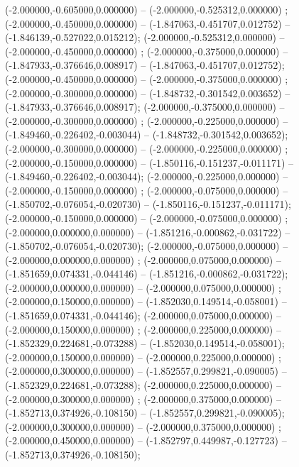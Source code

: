  (-2.000000,-0.605000,0.000000) -- (-2.000000,-0.525312,0.000000) ;
 (-2.000000,-0.450000,0.000000) -- (-1.847063,-0.451707,0.012752) -- (-1.846139,-0.527022,0.015212);
 (-2.000000,-0.525312,0.000000) -- (-2.000000,-0.450000,0.000000) ;
 (-2.000000,-0.375000,0.000000) -- (-1.847933,-0.376646,0.008917) -- (-1.847063,-0.451707,0.012752);
 (-2.000000,-0.450000,0.000000) -- (-2.000000,-0.375000,0.000000) ;
 (-2.000000,-0.300000,0.000000) -- (-1.848732,-0.301542,0.003652) -- (-1.847933,-0.376646,0.008917);
 (-2.000000,-0.375000,0.000000) -- (-2.000000,-0.300000,0.000000) ;
 (-2.000000,-0.225000,0.000000) -- (-1.849460,-0.226402,-0.003044) -- (-1.848732,-0.301542,0.003652);
 (-2.000000,-0.300000,0.000000) -- (-2.000000,-0.225000,0.000000) ;
 (-2.000000,-0.150000,0.000000) -- (-1.850116,-0.151237,-0.011171) -- (-1.849460,-0.226402,-0.003044);
 (-2.000000,-0.225000,0.000000) -- (-2.000000,-0.150000,0.000000) ;
 (-2.000000,-0.075000,0.000000) -- (-1.850702,-0.076054,-0.020730) -- (-1.850116,-0.151237,-0.011171);
 (-2.000000,-0.150000,0.000000) -- (-2.000000,-0.075000,0.000000) ;
 (-2.000000,0.000000,0.000000) -- (-1.851216,-0.000862,-0.031722) -- (-1.850702,-0.076054,-0.020730);
 (-2.000000,-0.075000,0.000000) -- (-2.000000,0.000000,0.000000) ;
 (-2.000000,0.075000,0.000000) -- (-1.851659,0.074331,-0.044146) -- (-1.851216,-0.000862,-0.031722);
 (-2.000000,0.000000,0.000000) -- (-2.000000,0.075000,0.000000) ;
 (-2.000000,0.150000,0.000000) -- (-1.852030,0.149514,-0.058001) -- (-1.851659,0.074331,-0.044146);
 (-2.000000,0.075000,0.000000) -- (-2.000000,0.150000,0.000000) ;
 (-2.000000,0.225000,0.000000) -- (-1.852329,0.224681,-0.073288) -- (-1.852030,0.149514,-0.058001);
 (-2.000000,0.150000,0.000000) -- (-2.000000,0.225000,0.000000) ;
 (-2.000000,0.300000,0.000000) -- (-1.852557,0.299821,-0.090005) -- (-1.852329,0.224681,-0.073288);
 (-2.000000,0.225000,0.000000) -- (-2.000000,0.300000,0.000000) ;
 (-2.000000,0.375000,0.000000) -- (-1.852713,0.374926,-0.108150) -- (-1.852557,0.299821,-0.090005);
 (-2.000000,0.300000,0.000000) -- (-2.000000,0.375000,0.000000) ;
 (-2.000000,0.450000,0.000000) -- (-1.852797,0.449987,-0.127723) -- (-1.852713,0.374926,-0.108150);
